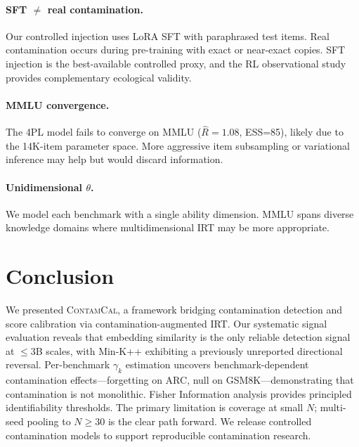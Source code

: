 \documentclass[11pt,a4paper]{article}
\newcommand{\contamcal}{\textsc{ContamCal}}
\begin{document}
\paragraph{SFT $\neq$ real contamination.} Our controlled injection uses LoRA SFT with paraphrased test items. Real contamination occurs during pre-training with exact or near-exact copies. SFT injection is the best-available controlled proxy, and the RL observational study provides complementary ecological validity.

\paragraph{MMLU convergence.} The 4PL model fails to converge on MMLU ($\hat{R}=1.08$, ESS=85), likely due to the 14K-item parameter space. More aggressive item subsampling or variational inference may help but would discard information.

\paragraph{Unidimensional $\theta$.} We model each benchmark with a single ability dimension. MMLU spans diverse knowledge domains where multidimensional IRT \cite{reckase2009mirt,burnell2023mirt_llm} may be more appropriate.

\section{Conclusion}
\label{sec:conclusion}

We presented \contamcal{}, a framework bridging contamination detection and score calibration via contamination-augmented IRT. Our systematic signal evaluation reveals that embedding similarity is the only reliable detection signal at $\leq$3B scales, with Min-K++ exhibiting a previously unreported directional reversal. Per-benchmark $\gamma_k$ estimation uncovers benchmark-dependent contamination effects---forgetting on ARC, null on GSM8K---demonstrating that contamination is not monolithic. Fisher Information analysis provides principled identifiability thresholds. The primary limitation is coverage at small $N$; multi-seed pooling to $N \geq 30$ is the clear path forward. We release controlled contamination models to support reproducible contamination research.
\end{document}
